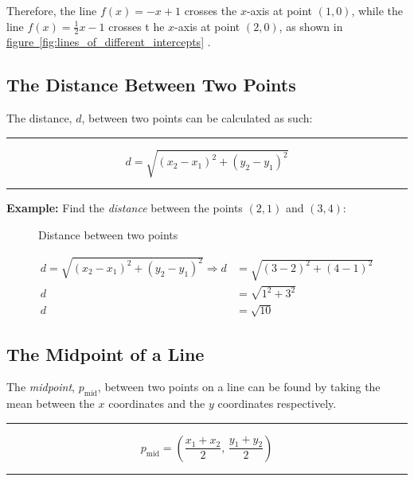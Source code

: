 \documentclass[a5paper,9pt]{book}
\theoremstyle{definition}
\newcommand{\txtlinesur}[1]{%
    \vspace*{\baselineskip}

    \hrule%

    \vspace*{\medskipamount}

    #1

    \vspace*{\medskipamount}

    \hrule%

    \vspace*{\baselineskip}
}
\newcommand{\eqlinesur}[1]{%
    \vspace*{\baselineskip}

    \hrule%

    \vspace*{\medskipamount}

    #1

    \vspace*{\medskipamount-0.5\belowdisplayskip}

    \hrule%

    \vspace*{\baselineskip}
}
\newcommand{\Rarr}{\Rightarrow}
\newcommand{\fig}[2]{%
    \hyperref[#2]{#1~\ref*{#2}}%
}
\begin{document}
        Therefore, the line $f(x)=-x+1$ crosses the $x$-axis at point $(1,0)$, while
        the line $f(x)=\frac{1}{2}x-1$ crosses t he $x$-axis at point $(2,0)$, as shown
        in \fig{figure}{fig:lines_of_different_intercepts}.

        \subsection{The Distance Between Two Points}

        The distance, $d$, between two points can be calculated as such:

        \txtlinesur{%
            \begin{equation}
                d = \sqrt{{(x_2-x_1)}^2 + {(y_2-y_1)}^2}
                \label{eq:distance_between_two_points}
            \end{equation}
        }

        \pagebreak

        \noindent\textbf{Example:} Find the \emph{distance} between the points $(2,1)$
        and $(3,4)$:

        \begin{figure}[ht]
            \centering
            
            \caption{Distance between two points}\label{fig:distance_between_two_points}
        \end{figure}

        \begin{align*}
            d = \sqrt{{(x_2-x_1)}^2+{(y_2-y_1)}^2} \Rarr d &= \sqrt{{(3-2)}^2+{(4-1)}^2} \\[5pt]
            d &= \sqrt{1^2 + 3^2} \\[5pt]
            d &= \sqrt{10}
        \end{align*}

        \subsection{The Midpoint of a Line}

        The \emph{midpoint}, $p_\mathrm{mid}$, between two points on a line can be found by taking the mean
        between the $x$ coordinates and the $y$ coordinates respectively.

        \eqlinesur{%
            \begin{equation}
                p_\mathrm{mid} = \left(\frac{x_1+x_2}{2},\,\frac{y_1+y_2}{2}\right)
                \label{eq:midpoint}
            \end{equation}
        }
\end{document}

